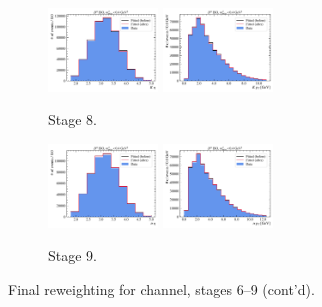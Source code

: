 \begin{figure}[htb]
    \begin{subfigure}{\textwidth}
        \centering
        \includegraphics[width=0.32\textwidth]{./figs-mc-correction/reweighting-final/plot_step7-D0_iso-k_eta.pdf}
        \includegraphics[width=0.32\textwidth]{./figs-mc-correction/reweighting-final/plot_step7-D0_iso-k_pt.pdf}
        \caption{Stage 8.}
    \end{subfigure}

    \begin{subfigure}{\textwidth}
        \centering
        \includegraphics[width=0.32\textwidth]{./figs-mc-correction/reweighting-final/plot_step8-D0_iso-pi_eta.pdf}
        \includegraphics[width=0.32\textwidth]{./figs-mc-correction/reweighting-final/plot_step8-D0_iso-pi_pt.pdf}
        \caption{Stage 9.}
    \end{subfigure}

    \caption{Final reweighting for \Dz channel, stages 6--9 (cont'd).}
    \label{fig:final-rwt-d0-idx2}
\end{figure}

